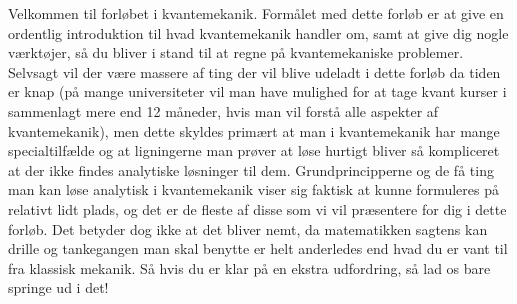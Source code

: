Velkommen til forløbet i kvantemekanik. Formålet med dette forløb er at give en ordentlig introduktion til hvad kvantemekanik handler om, samt at give dig nogle værktøjer, så du bliver i stand til at regne på kvantemekaniske problemer. Selvsagt vil der være massere af ting der vil blive udeladt i dette forløb da tiden er knap (på mange universiteter vil man have mulighed for at tage kvant kurser i sammenlagt mere end 12 måneder, hvis man vil forstå alle aspekter af kvantemekanik), men dette skyldes primært at man i kvantemekanik har mange specialtilfælde og at ligningerne man prøver at løse hurtigt bliver så kompliceret at der ikke findes analytiske løsninger til dem. Grundprincipperne og de få ting man kan løse analytisk i kvantemekanik viser sig faktisk at kunne formuleres på relativt lidt plads, og det er de fleste af disse som vi vil præsentere for dig i dette forløb. Det betyder dog ikke at det bliver nemt, da matematikken sagtens kan drille og tankegangen man skal benytte er helt anderledes end hvad du er vant til fra klassisk mekanik. Så hvis du er klar på en ekstra udfordring, så lad os bare springe ud i det!